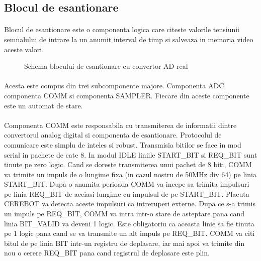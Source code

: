 \subsection{Blocul de esantionare}

\paragraph{}

Blocul de esantionare este o componenta logica care citeste valorile tensiunii semnalului de intrare la un anumit interval de timp si salveaza in memoria video aceste valori.



\begin{figure}[h]
\centering
\setlength\fboxsep{0pt}
\setlength\fboxrule{0.5pt}
\caption{Schema blocului de esantionare cu convertor AD real}
\label{fig:oscupdate}
\end{figure}


\paragraph{}
Acesta este compus din trei subcomponente majore. Componenta ADC, componenta COMM si componenta SAMPLER. Fiecare din aceste componente este un automat de stare.


\paragraph{}
Componenta COMM este responsabila cu transmiterea de informatii dintre convertorul analog digital si componenta de esantionare. Protocolul de comunicare este simplu de inteles si robust. Transmisia bitilor se face in mod serial in pachete de cate 8. In modul IDLE liniile START\_BIT si REQ\_BIT sunt tinute pe zero logic. Cand se doreste transmiterea unui pachet de 8 biti, COMM va trimite un impuls de o lungime fixa (in cazul nostru de 50MHz div 64) pe linia START\_BIT. Dupa o anumita perioada COMM va incepe sa trimita impulsuri pe linia REQ\_BIT de aceiasi lungime cu impulsul de pe START\_BIT. Placuta CEREBOT va detecta aceste impulsuri ca intreruperi externe. Dupa ce s-a trimis un impuls pe REQ\_BIT, COMM va intra intr-o stare de asteptare pana cand linia BIT\_VALID va deveni 1 logic. Este obligatoriu ca aceasta linie sa fie tinuta pe 1 logic pana cand se va transmite un alt impuls pe REQ\_BIT. COMM va citi bitul de pe linia BIT intr-un registru de deplasare, iar mai apoi va trimite din nou o cerere REQ\_BIT pana cand registrul de deplasare este plin.


